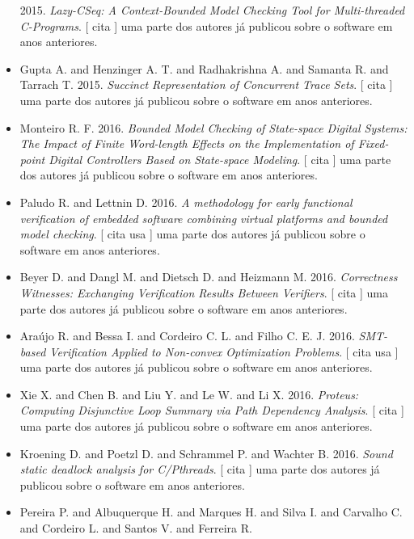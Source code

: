 \begin{itemize}
      2015.
        \textit{ Lazy-CSeq: A Context-Bounded Model Checking Tool for Multi-threaded C-Programs}.
      [
          cita
      ]
uma parte dos autores já publicou sobre o software em anos anteriores.
\item Gupta A. and Henzinger A. T. and Radhakrishna A. and Samanta R. and Tarrach T.
      2015.
        \textit{ Succinct Representation of Concurrent Trace Sets}.
      [
          cita
      ]
uma parte dos autores já publicou sobre o software em anos anteriores.
\item Monteiro R. F.
      2016.
        \textit{ Bounded Model Checking of State-space Digital Systems: The Impact of Finite Word-length Effects on the Implementation of Fixed-point Digital Controllers Based on State-space Modeling}.
      [
          cita
      ]
uma parte dos autores já publicou sobre o software em anos anteriores.
\item Paludo R. and Lettnin D.
      2016.
        \textit{ A methodology for early functional verification of embedded software combining virtual platforms and bounded model checking}.
      [
          cita
          usa
      ]
uma parte dos autores já publicou sobre o software em anos anteriores.
\item Beyer D. and Dangl M. and Dietsch D. and Heizmann M.
      2016.
        \textit{ Correctness Witnesses: Exchanging Verification Results Between Verifiers}.
      [
          cita
      ]
uma parte dos autores já publicou sobre o software em anos anteriores.
\item Araújo R. and Bessa I. and Cordeiro C. L. and Filho C. E. J.
      2016.
        \textit{ SMT-based Verification Applied to Non-convex Optimization Problems}.
      [
          cita
          usa
      ]
uma parte dos autores já publicou sobre o software em anos anteriores.
\item Xie X. and Chen B. and Liu Y. and Le W. and Li X.
      2016.
        \textit{ Proteus: Computing Disjunctive Loop Summary via Path Dependency Analysis}.
      [
          cita
      ]
uma parte dos autores já publicou sobre o software em anos anteriores.
\item Kroening D. and Poetzl D. and Schrammel P. and Wachter B.
      2016.
        \textit{ Sound static deadlock analysis for C/Pthreads}.
      [
          cita
      ]
uma parte dos autores já publicou sobre o software em anos anteriores.
\item Pereira P. and Albuquerque H. and Marques H. and Silva I. and Carvalho C. and Cordeiro L. and Santos V. and Ferreira R.

\end{itemize}
